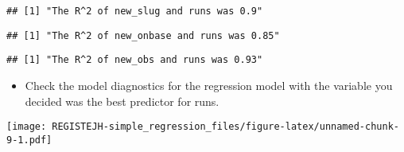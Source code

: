 \documentclass[
]{article}
\newenvironment{Shaded}{\begin{snugshade}}{\end{snugshade}}
\newcommand{\DecValTok}[1]{\textcolor[rgb]{0.00,0.00,0.81}{#1}}
\newcommand{\KeywordTok}[1]{\textcolor[rgb]{0.13,0.29,0.53}{\textbf{#1}}}
\newcommand{\NormalTok}[1]{#1}
\newcommand{\OperatorTok}[1]{\textcolor[rgb]{0.81,0.36,0.00}{\textbf{#1}}}
\newcommand{\StringTok}[1]{\textcolor[rgb]{0.31,0.60,0.02}{#1}}
\providecommand{\tightlist}{%
  \setlength{\itemsep}{0pt}\setlength{\parskip}{0pt}}
\begin{document}
\begin{verbatim}
## [1] "The R^2 of new_slug and runs was 0.9"
\end{verbatim}

\begin{Shaded}
\end{Shaded}

\begin{verbatim}
## [1] "The R^2 of new_onbase and runs was 0.85"
\end{verbatim}

\begin{Shaded}
\end{Shaded}

\begin{verbatim}
## [1] "The R^2 of new_obs and runs was 0.93"
\end{verbatim}

\begin{itemize}
\tightlist
\item
  Check the model diagnostics for the regression model with the variable
  you decided was the best predictor for runs.
\end{itemize}

\begin{Shaded}
\end{Shaded}

\texttt{[image: REGISTEJH-simple\_regression\_files/figure-latex/unnamed-chunk-9-1.pdf]}

\begin{Shaded}
\end{Shaded}
\end{document}
